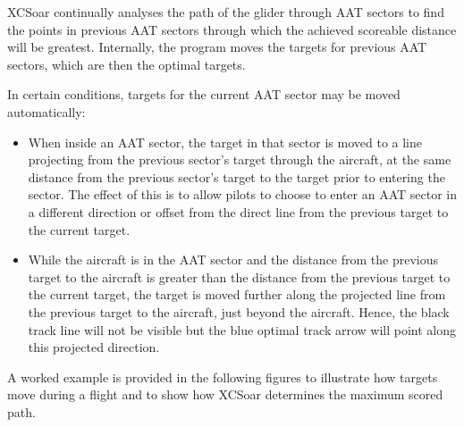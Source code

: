 XCSoar continually analyses the path of the glider through AAT sectors
to find the points in previous AAT sectors through which the achieved
scoreable distance will be greatest.  Internally, the program moves
the targets for previous AAT sectors, which are then the optimal
targets.

In certain conditions, targets for the current AAT sector may be moved
automatically:
\begin{itemize}
\item When inside an AAT sector, the target in that sector is moved
to a line projecting from the previous sector's target through the
aircraft, at the same distance from the previous sector's target to
the target prior to entering the sector.  The effect of this is to
allow pilots to choose to enter an AAT sector in a different direction
or offset from the direct line from the previous target to the current
target.

\item While the aircraft is in the AAT sector and the distance from the
previous target to the aircraft is greater than the distance from the
previous target to the current target, the target is moved further
along the projected line from the previous target to the aircraft,
just beyond the aircraft.  Hence, the black track line will not be
visible but the blue optimal track arrow will point along this
projected direction.
\end{itemize}

A worked example is provided in the following figures to illustrate
how targets move during a flight and to show how XCSoar determines the
maximum scored path.

